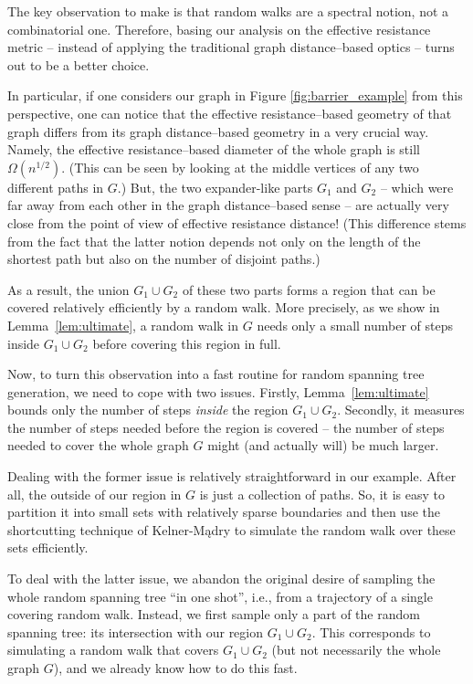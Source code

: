\documentclass[11pt, letterpaper]{article}
\begin{document}
The key observation to make is that random walks are a spectral notion, not a combinatorial one. Therefore, basing our analysis on the effective resistance metric -- instead of applying the traditional graph distance--based optics -- turns out to be a better choice. 

In particular, if one considers our graph in Figure \ref{fig:barrier_example} from this perspective, one can notice that the effective resistance--based geometry of that graph differs from its graph distance--based geometry in a very crucial way. Namely, the effective resistance--based diameter of the whole graph is still $\Omega(n^{1/2})$. (This can be seen by looking at the middle vertices of any two different paths in $G$.) But, the two expander-like parts $G_1$ and $G_2$ -- which were far away from each other in the graph distance--based sense -- are actually very close from the point of view of effective resistance distance! (This difference stems from the fact that the latter notion depends not only on the length of the shortest path but also on the number of disjoint paths.) 

As a result, the union $G_1 \cup G_2$ of these two parts forms a region that can be covered relatively efficiently by a random walk. More precisely, as we show in Lemma~\ref{lem:ultimate}, a random walk in $G$ needs only a small number of steps {inside} $G_1\cup G_2$ before covering this region in full. 

Now, to turn this observation into a fast routine for random spanning tree generation, we need to cope with two issues. Firstly, Lemma~\ref{lem:ultimate} bounds only the number of steps {\em inside} the region $G_1\cup G_2$. Secondly, it measures the number of steps needed before the region is covered -- the number of steps needed to cover the whole graph $G$ might (and actually will) be much larger. 

Dealing with the former issue is relatively straightforward in our example. After all, the outside of our region in $G$ is just a collection of paths. So, it is easy to partition it into small sets with relatively sparse boundaries and then use the shortcutting technique of Kelner-Mądry to simulate the random walk over these sets efficiently. 

To deal with the latter issue, we abandon the original desire of sampling the whole random spanning tree ``in one shot'', i.e., from a trajectory of a single covering random walk. Instead, we first sample only a part of the random spanning tree: its intersection with our region $G_1\cup G_2$. This corresponds to simulating a random walk that covers $G_1\cup G_2$ (but not necessarily the whole graph $G$), and we already know how to do this fast. 
\end{document}
